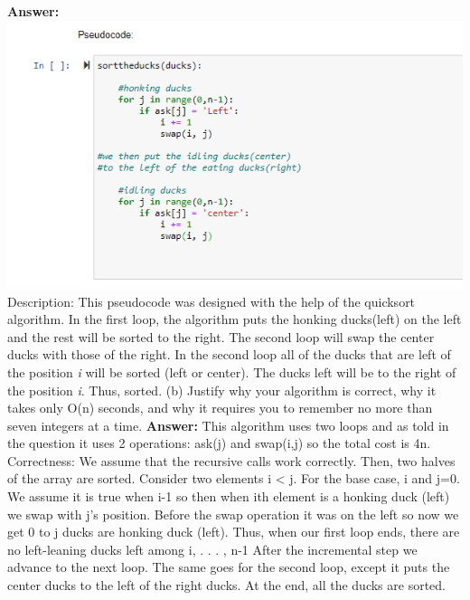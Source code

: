 \documentclass{article}
\begin{document}
\begin{flushleft}
\textbf{Answer:}
\includegraphics{q3a}
Description: This pseudocode was designed with the help of the quicksort algorithm. In the first loop, the algorithm puts the honking ducks(left) on the left and the rest will be sorted to the right. The second loop will swap the center ducks with those of the right. In the second loop all of the ducks that are left of the position \textit{i} will be sorted (left or center). The ducks left will be to the right of the position \textit{i}. Thus, sorted.
\linebreak 
(b) Justify why your algorithm is correct, why it takes only O(n) seconds, and why it
requires you to remember no more than seven integers at a time.
\linebreak 
\textbf{
Answer:} This algorithm uses two loops and as told in the question it uses 2 operations: ask(j) and swap(i,j) so the total cost is 4n.\\

Correctness: 
We assume that the recursive calls work correctly. Then, two halves of the array are sorted. Consider two elements i < j. For the base case, i and j=0. We assume it is true when i-1 so then when ith element is a honking duck (left) we swap  with j's position. Before the swap operation it was on the left so now we get 0 to j ducks are honking duck (left). Thus, when our first loop ends, there are no
left-leaning ducks left among i, . . . , n-1 After the incremental step we advance to the next loop. The same goes for the second loop, except it puts the center ducks to the left of the right ducks. At the end, all the ducks are sorted.
\end{flushleft}
\end{document}
